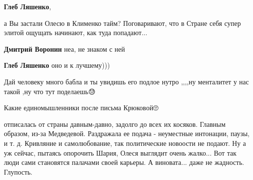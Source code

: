 \begin{itemize}
\textbf{Глеб Ляшенко},

а Вы застали Олесю в Клименко тайм? Поговаривают, что в Стране себя супер элитой
ощущать начинают, как туда попадают...

\begin{itemize}
 
\textbf{Дмитрий Воронин} неа, не знаком с ней

 
\textbf{Глеб Ляшенко} оно и к лучшему)))
\end{itemize}

 
Дай человеку много бабла и ты увидишь его подлое нутро ,,,,ну менталитет у нас такой ,ну что тут поделаешь😓

 
Какие единомышленники после письма Крюковой🙄

 

отписалась от страны давным-давно, задолго до всех их косяков. Главным образом,
из-за Медведевой. Раздражала ее подача - неуместные интонации, паузы, и т. д.
Кривляние и самолюбование, так политические новоости не подают. Ну а уж сейчас,
пытаясь опорочить Шария, Олеся выглядит очень жалко... Вот так люди сами
становятся палачами своей карьеры. А виновата... даже не жадность. Глупость.



\end{itemize}

